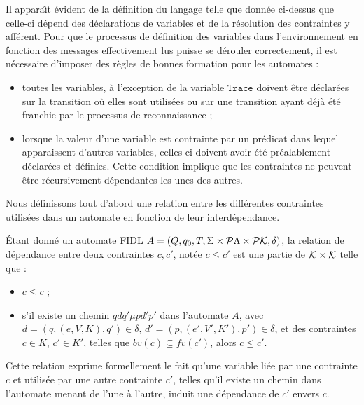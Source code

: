 Il appara\^{\i}t \'evident de la d\'efinition du langage telle que
donn\'ee ci-dessus que celle-ci d\'epend des d\'eclarations de
variables et de la r\'esolution des contraintes y aff\'erent. Pour
que le processus de d\'efinition des variables dans l'environnement
en fonction des messages effectivement lus puisse se d\'erouler
correctement, il est n\'ecessaire d'imposer des r\`egles de
bonnes formation pour les automates :
\begin{itemize}
  \item toutes les variables, \`a l'exception de la variable
    $\mathtt{Trace}$ doivent \^etre d\'eclar\'ees sur la transition
    o\`u elles sont utilis\'ees ou sur une transition ayant d\'ej\`a
    \'et\'e franchie par le processus de reconnaissance ;
  \item lorsque la valeur d'une variable est contrainte par un
    pr\'edicat dans lequel apparaissent d'autres variables, celles-ci
    doivent avoir \'et\'e pr\'ealablement d\'eclar\'ees et
    d\'efinies. Cette condition implique que les contraintes ne
    peuvent \^etre r\'ecursivement d\'ependantes les unes des
    autres. 
\end{itemize}

Nous d\'efinissons tout d'abord une relation entre les diff\'erentes
contraintes utilis\'ees dans un automate en fonction de leur
interd\'ependance. 

\begin{definition}
    \'Etant donn\'e un automate \textsf{FIDL}  $A= (Q,q_0,T,\Sigma
    \times{}{\cal P}\Lambda \times{}{\cal P}\mathcal{K},\delta)$, la relation
    de d\'ependance entre deux contraintes $c,c'$, not\'ee $c\leq c'$ est une partie
    de  ${\cal K}\times{}{\cal K}$  telle que :
    \begin{itemize}
      \item $c\leq c$ ;
      \item s'il existe un chemin $q d q' \mu{} p
      d' p'$  dans l'automate $A$, avec $d=(q,(e,V,K),q') \in \delta$,
      $d'=(p,(e',V',K'),p') \in \delta$, et des contraintes $c\in K$,
      $c' \in K'$, telles que $bv(c)\subseteq fv(c')$, alors $c\leq c'$. 
    \end{itemize}
\end{definition}

Cette relation exprime formellement le fait qu'une variable li\'ee
par une contrainte $c$ et utilis\'ee par une autre contrainte $c'$, telles
qu'il existe un chemin dans l'automate menant de l'une \`a l'autre,
induit une d\'ependance de $c'$ envers $c$.

